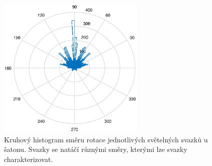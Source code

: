 \begin{figure}[h!]
\begin{center}
\includegraphics[width = 7cm]{figures/saton_smer.eps}
\end{center}
\caption{Kruhový histogram směru rotace jednotlivých světelných svazků u šatonu. Svazky se natáčí různými směry, kterými lze svazky charakterizovat.}

\label{fig:kruhovy histogram saton}
\end{figure}

  
\clearpage